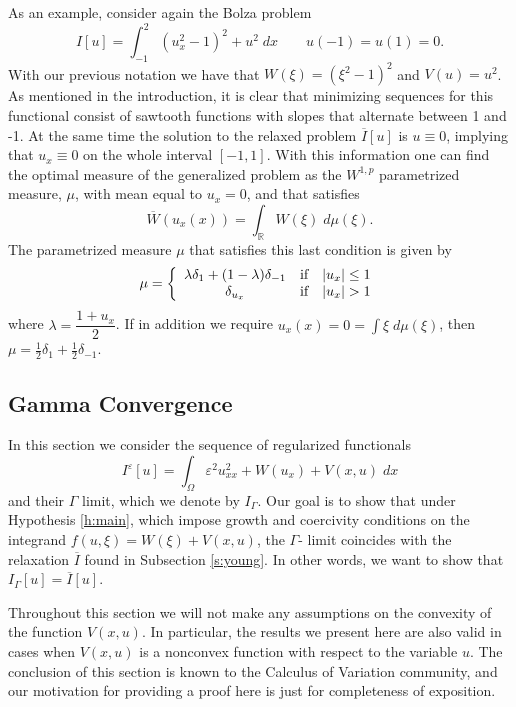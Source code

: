 \documentclass[11pt]{article}
\newcommand{\eps}{\varepsilon}
\newcommand{\R}{\mathbb{R}}
\theoremstyle{plain}
\begin{document}
As an example, consider again the Bolza problem
\[I[u] = \int_{-1}^2 (u_x^2-1)^2 + u^2 \;dx \qquad u(-1) = u(1) =0.\]
With our previous notation we have that $W(\xi) = (\xi^2-1)^2$ and $V(u) =u^2$.
As mentioned in the introduction, it is clear that minimizing sequences for this functional consist of sawtooth functions with slopes that alternate between 1 and -1. At the same time the solution to the relaxed problem $\overline{I}[u]$ is $u \equiv 0$, implying that $u_x \equiv 0$ on the whole interval $[-1,1]$. With this information one can find the optimal measure of the generalized problem as the $W^{1,p}$ parametrized measure, $\mu$, with mean equal to $u_x=0$, and that satisfies
\begin{equation}\label{e:bolzameasure}
 \overline{W}(u_x(x)) = \int_\R W(\xi) \;d\mu(\xi).
 \end{equation}
The parametrized measure $\mu$ that satisfies this last condition is given by
\[ \mu = \left \{ \begin{array}{ c c c}
\lambda \delta_1 + (1-\lambda) \delta_{-1} & \mbox{if} & |u_x|\leq 1\\
\delta_{u_x} & \mbox{if} & |u_x|>1
\end{array} \right. 
\]
where $\lambda= \dfrac{1+u_x}{2}$. If in addition we require $u_x(x) =0= \int \xi \;d\mu(\xi)$, then $\mu = \frac{1}{2} \delta_1 + \frac{1}{2} \delta_{-1}$.




\subsection{Gamma Convergence}\label{s:Gamma}
In this section we consider the sequence of regularized functionals 
\begin{equation}\label{e:regularized}
 I^\eps[u] = \int_\Omega \eps^2 u_{xx}^2 + W(u_x) + V(x,u) \;dx
 \end{equation}
 and their $\Gamma$ limit, which we denote by $I_\Gamma$. Our goal is to show that under Hypothesis \ref{h:main}, which impose growth and coercivity conditions on the integrand $f(u, \xi) = W(\xi) + V(x,u)$, the $\Gamma$- limit coincides with the relaxation $\overline{I}$ found in Subsection \ref{s:young}. In other words, we want to show that $I_\Gamma[u] = \overline{I}[u]$.
 
Throughout this section we will not make any assumptions on the convexity of the function $V(x,u)$. In particular, the results we present here are also valid in cases when $V(x,u)$ is a nonconvex function with respect to the variable $u$. The conclusion of this section is known to the Calculus of Variation community, and our motivation for providing a proof here is just for completeness of exposition.
\end{document}
